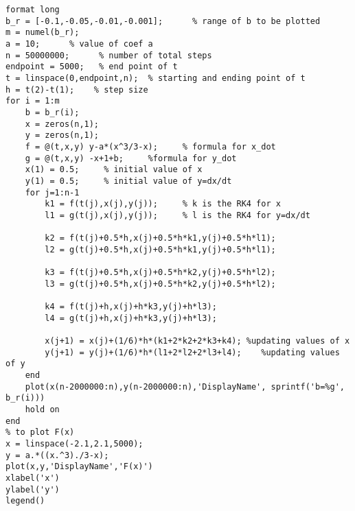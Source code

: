 \lstset{basicstyle=\footnotesize,style=myCustomMatlabStyle}
\begin{lstlisting}
format long
b_r = [-0.1,-0.05,-0.01,-0.001];      % range of b to be plotted
m = numel(b_r);
a = 10;      % value of coef a
n = 50000000;      % number of total steps
endpoint = 5000;   % end point of t 
t = linspace(0,endpoint,n);  % starting and ending point of t
h = t(2)-t(1);    % step size
for i = 1:m
    b = b_r(i);
    x = zeros(n,1);
    y = zeros(n,1);
    f = @(t,x,y) y-a*(x^3/3-x);     % formula for x_dot
    g = @(t,x,y) -x+1+b;     %formula for y_dot
    x(1) = 0.5;     % initial value of x
    y(1) = 0.5;     % initial value of y=dx/dt
    for j=1:n-1
        k1 = f(t(j),x(j),y(j));     % k is the RK4 for x
        l1 = g(t(j),x(j),y(j));     % l is the RK4 for y=dx/dt

        k2 = f(t(j)+0.5*h,x(j)+0.5*h*k1,y(j)+0.5*h*l1);
        l2 = g(t(j)+0.5*h,x(j)+0.5*h*k1,y(j)+0.5*h*l1);

        k3 = f(t(j)+0.5*h,x(j)+0.5*h*k2,y(j)+0.5*h*l2);
        l3 = g(t(j)+0.5*h,x(j)+0.5*h*k2,y(j)+0.5*h*l2);

        k4 = f(t(j)+h,x(j)+h*k3,y(j)+h*l3);
        l4 = g(t(j)+h,x(j)+h*k3,y(j)+h*l3);

        x(j+1) = x(j)+(1/6)*h*(k1+2*k2+2*k3+k4); %updating values of x
        y(j+1) = y(j)+(1/6)*h*(l1+2*l2+2*l3+l4);    %updating values of y
    end
    plot(x(n-2000000:n),y(n-2000000:n),'DisplayName', sprintf('b=%g', b_r(i)))
    hold on
end
% to plot F(x)
x = linspace(-2.1,2.1,5000);
y = a.*((x.^3)./3-x);
plot(x,y,'DisplayName','F(x)')
xlabel('x')
ylabel('y')
legend()

\end{lstlisting}
